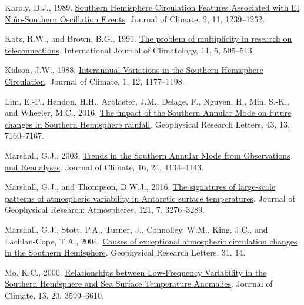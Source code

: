 \documentclass[12pt,oneside]{reedthesis}
\newlength{\cslhangindent}
\newenvironment{CSLReferences}[2] %
 {%
  \setlength{\parindent}{0pt}
  \ifodd #1 \everypar{\setlength{\hangindent}{\cslhangindent}}\ignorespaces\fi
  \ifnum #2 > 0
  \setlength{\parskip}{#2\baselineskip}
  \fi
 }%
 {}
\begin{document}
\begin{CSLReferences}{1}{0}
\leavevmode{}%
Karoly, D.J., 1989. \href{https://doi.org/10.1175/1520-0442(1989)002\%3C1239:SHCFAW\%3E2.0.CO;2}{Southern {Hemisphere Circulation Features Associated} with {El Niño-Southern Oscillation Events}}. Journal of Climate, 2, 11, 1239--1252.

\leavevmode{}%
Katz, R.W., and Brown, B.G., 1991. \href{https://doi.org/10.1002/joc.3370110504}{The problem of multiplicity in research on teleconnections}. International Journal of Climatology, 11, 5, 505--513.

\leavevmode{}%
Kidson, J.W., 1988. \href{https://doi.org/10.1175/1520-0442(1988)001\%3C1177:IVITSH\%3E2.0.CO;2}{Interannual {Variations} in the {Southern Hemisphere Circulation}}. Journal of Climate, 1, 12, 1177--1198.

\leavevmode{}%
Lim, E.-P., Hendon, H.H., Arblaster, J.M., Delage, F., Nguyen, H., Min, S.-K., and Wheeler, M.C., 2016. \href{https://doi.org/10.1002/2016GL069453}{The impact of the {Southern Annular Mode} on future changes in {Southern Hemisphere} rainfall}. Geophysical Research Letters, 43, 13, 7160--7167.

\leavevmode{}%
Marshall, G.J., 2003. \href{https://doi.org/10.1175/1520-0442(2003)016\%3C4134:TITSAM\%3E2.0.CO;2}{Trends in the {Southern Annular Mode} from {Observations} and {Reanalyses}}. Journal of Climate, 16, 24, 4134--4143.

\leavevmode{}%
Marshall, G.J., and Thompson, D.W.J., 2016. \href{https://doi.org/10.1002/2015JD024665}{The signatures of large-scale patterns of atmospheric variability in {Antarctic} surface temperatures}. Journal of Geophysical Research: Atmospheres, 121, 7, 3276--3289.

\leavevmode{}%
Marshall, G.J., Stott, P.A., Turner, J., Connolley, W.M., King, J.C., and Lachlan-Cope, T.A., 2004. \href{https://doi.org/10.1029/2004GL019952}{Causes of exceptional atmospheric circulation changes in the {Southern Hemisphere}}. Geophysical Research Letters, 31, 14.

\leavevmode{}%
Mo, K.C., 2000. \href{https://doi.org/10.1175/1520-0442(2000)013\%3C3599:RBLFVI\%3E2.0.CO;2}{Relationships between {Low-Frequency Variability} in the {Southern Hemisphere} and {Sea Surface Temperature Anomalies}}. Journal of Climate, 13, 20, 3599--3610.


\end{CSLReferences}
\end{document}

